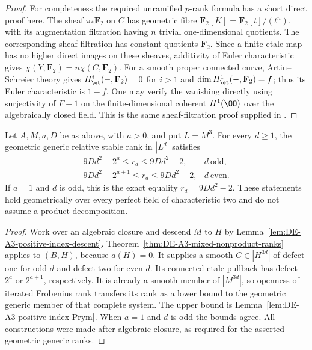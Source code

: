 \begin{proof}
For completeness the required unramified $p$-rank formula has
a short direct proof here.
The sheaf $\pi_*\mathbf F_2$ on $C$ has geometric fibre
$\mathbf F_2[K]=\mathbf F_2[t]/(t^n)$, with its augmentation
filtration having $n$ trivial one-dimensional quotients.
The corresponding sheaf filtration has constant quotients
$\mathbf F_2$.
Since a finite etale map has no higher direct images on these
sheaves, additivity of Euler characteristic gives
$\chi(Y,\mathbf F_2)=n\chi(C,\mathbf F_2)$.
For a smooth proper connected curve, Artin--Schreier theory gives
$H^i_{\et}(-,\mathbf F_2)=0$ for $i>1$ and
$\dim H^1_{\et}(-,\mathbf F_2)=f$; thus its Euler characteristic
is $1-f$.
One may verify the vanishing directly using surjectivity of
$F-1$ on the finite-dimensional coherent $H^1(\OO)$ over the
algebraically closed field.
This is the same sheaf-filtration proof supplied in
\cite[Section~3, first alternative proof, p.~42;
Lemma~1.9.2, p.~37]{Crew1984EtaleP}.
\end{proof}

\begin{theorem}
\label{thm:DE-A3-positive-index-bounds}
Let $A,M,a,D$ be as above, with $a>0$, and put $L=M^3$.
For every $d\ge1$, the geometric generic relative stable rank
in $|L^d|$ satisfies
\[
 \begin{array}{ll}
 9Dd^2-2^a\le r_d\le9Dd^2-2,&d\ \text{odd},\\[2pt]
 9Dd^2-2^{a+1}\le r_d\le9Dd^2-2,&d\ \text{even}.
 \end{array}
\]
If $a=1$ and $d$ is odd, this is the exact equality
$r_d=9Dd^2-2$.
These statements hold geometrically over every perfect field
of characteristic two and do not assume a product decomposition.
\end{theorem}
\begin{proof}
Work over an algebraic closure and descend $M$ to $H$ by
Lemma~\ref{lem:DE-A3-positive-index-descent}.
Theorem~\ref{thm:DE-A3-mixed-nonproduct-ranks} applies to $(B,H)$,
because $a(H)=0$.
It supplies a smooth $C\in|H^{3d}|$ of defect one for odd $d$
and defect two for even $d$.
Its connected etale pullback has defect $2^a$ or $2^{a+1}$,
respectively.
It is already a smooth member of $|M^{3d}|$, so openness of
iterated Frobenius rank transfers its rank as a lower bound to
the geometric generic member of that complete system.
The upper bound is Lemma~\ref{lem:DE-A3-positive-index-Prym}.
When $a=1$ and $d$ is odd the bounds agree.
All constructions were made after algebraic closure, as required
for the asserted geometric generic ranks.
\end{proof}

